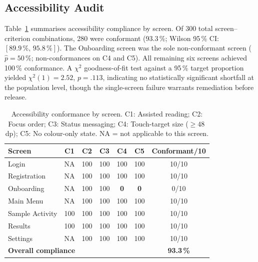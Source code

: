 \documentclass[preprint,12pt]{elsarticle}
\begin{document}
        \subsection{Accessibility Audit}
        \label{subsec:access}
            Table~\ref{tab:access_screen} summarises accessibility compliance by screen. Of 300 total screen--criterion combinations, 280 were conformant (93.3\,\%; Wilson 95\,\% CI: $[89.9\,\%,\,95.8\,\%]$). The Onboarding screen was the sole non-conformant screen ($\hat{p} = 50\,\%$; non-conformances on C4 and C5). All remaining six screens achieved 100\,\% conformance. A $\chi^2$ goodness-of-fit test against a 95\,\% target proportion yielded $\chi^2(1) = 2.52$, $p = .113$, indicating no statistically significant shortfall at the population level, though the single-screen failure warrants remediation before release.
            
            \begin{table}[t]
                \centering
                \caption{Accessibility conformance by screen. C1: Assisted reading; C2: Focus order; C3: Status messaging; C4: Touch-target size ($\geq 48$\,dp); C5: No colour-only state. NA = not applicable to this screen.}
                \label{tab:access_screen}
                \begin{tabular}{@{}lcccccc@{}}
                    \toprule
                    \textbf{Screen} & \textbf{C1} & \textbf{C2} & \textbf{C3} & \textbf{C4} & \textbf{C5} & \textbf{Conformant/10} \\
                    \midrule
                    Login           & NA & 100 & 100 & 100 & 100 & 10/10 \\
                    Registration    & NA & 100 & 100 & 100 & 100 & 10/10 \\
                    Onboarding      & NA & 100 & 100 & \textbf{0} & \textbf{0} & 0/10 \\
                    Main Menu       & NA & 100 & 100 & 100 & 100 & 10/10 \\
                    Sample Activity & 100 & 100 & 100 & 100 & 100 & 10/10 \\
                    Results         & 100 & 100 & 100 & 100 & 100 & 10/10 \\
                    Settings        & NA & 100 & 100 & 100 & 100 & 10/10 \\
                    \midrule
                    \multicolumn{6}{l}{\textbf{Overall compliance}} & \textbf{93.3\,\%} \\
                    \bottomrule
                \end{tabular}
            \end{table}
            
\end{document}
